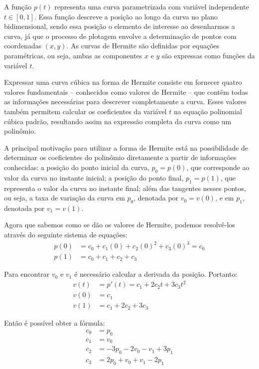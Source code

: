 A função $p(t)$ representa uma curva parametrizada com variável independente \( t \in [0,1] \). Essa função descreve a posição ao longo da curva no plano bidimensional, sendo essa posição o elemento de interesse ao desenharmos a curva, já que o processo de plotagem envolve a determinação de pontos com coordenadas $(x, y)$. As curvas de Hermite são definidas por equações paramétricas, ou seja, ambas as componentes $x$ e  $y$ são expressas como funções da variável $t$.

Expressar uma curva cúbica na forma de Hermite consiste em fornecer quatro valores fundamentais -- conhecidos como valores de Hermite -- que contêm todas as informações necessárias para descrever completamente a curva. Esses valores também permitem calcular os coeficientes da variável \( t \) na equação polinomial cúbica padrão, resultando assim na expressão completa da curva como um polinômio.

A principal motivação para utilizar a forma de Hermite está na possibilidade de determinar os coeficientes do polinômio diretamente a partir de informações conhecidas: a posição do ponto inicial da curva, \( p_0 = p(0) \), que corresponde ao valor da curva no instante inicial; a posição do ponto final, \( p_1 = p(1) \), que representa o valor da curva no instante final; além das tangentes nesses pontos, ou seja, a taxa de variação da curva em \( p_0 \), denotada por \( v_0 = v(0) \), e em \( p_1 \), denotada por \( v_1 = v(1) \).


Agora que sabemos como se dão os valores de Hermite, podemos resolvê-los através do seguinte sistema de equações:
\begin{align}
    p(0) &= c_0 + c_1(0) + c_2(0)^2 + c_3(0)^3 = c_0 \\
    p(1) &= c_0 + c_1 + c_2 + c_3
\end{align}


Para encontrar $v_0$ e $v_1$ é necessário calcular a derivada da posição. Portanto:
\begin{align}
    v(t) &= p'(t) = c_1 + 2c_2t + 3c_3t^2\\
    v(0) &= c_1\\
    v(1) &= c_1 + 2c_2 + 3c_3
\end{align}

Então é possível obter a fórmula:
\begin{align}
    c_0 &= p_0\\
    c_1 &= v_0\\
    c_2 &= -3p_0 - 2v_0 - v_1 + 3p_1\\
    c_3 &= 2p_0 + v_0 + v_1 - 2p_1
\end{align}

